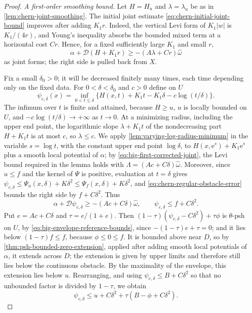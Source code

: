 \begin{proof}
\emph{A first-order smoothing bound.} Let $H=H_u$ and $\lambda=\lambda_u$ be as in \cref{lem:chern-joint-smoothing}. The initial joint estimate \eqref{eq:chern-initial-joint-bound} improves after adding $K_1r$. Indeed, the vertical Levi form of $K_1|w|$ is $K_1/(4r)$, and Young's inequality absorbs the bounded mixed term at a horizontal cost $Cr$. Hence, for a fixed sufficiently large $K_1$ and small $r$,
\begin{equation}\label{eq:big-first-corrected-joint}
 \alpha+\mathcal D(H+K_1r)\geq-(A\lambda+Cr)\widehat\omega
\end{equation}
as joint forms; the right side is pulled back from $X$.

Fix a small $\delta_0>0$; it will be decreased finitely many times, each time depending only on the fixed data. For $0<\delta<\delta_0$ and $c>0$ define on $U$
\[
 \psi_{c,\delta}(x)=\inf_{0<t\leq\delta}
 \{H(x,t)+K_1t-K_1\delta-c\log(t/\delta)\}.
\]
The infimum over $t$ is finite and attained, because $H\geq u$, $u$ is locally bounded on $U$, and $-c\log(t/\delta)\to+\infty$ as $t\to0$. At a minimizing radius, including the upper end point, the logarithmic slope $\lambda+K_1t$ of the nondecreasing part $H+K_1t$ is at most $c$, so $\lambda\leq c$. We apply \cref{lem:varying-log-radius-minimum} in the variable $s=\log t$, with the constant upper end point $\log\delta$, to $H(x,\mathrm e^s)+K_1\mathrm e^s$ plus a smooth local potential of $\alpha$; by \eqref{eq:big-first-corrected-joint}, the Levi bound required in the lemma holds with $\Lambda=(Ac+C\delta)\widehat\omega$. Moreover, since $u\leq f$ and the kernel of $\Psi$ is positive, evaluation at $t=\delta$ gives $\psi_{c,\delta}\leq\Psi_u(x,\delta)+K\delta^2\leq\Psi_f(x,\delta)+K\delta^2$, and \eqref{eq:chern-regular-obstacle-error} bounds the right side by $f+C\delta^2$. Thus
\[
 \alpha+\mathcal D\psi_{c,\delta}\geq-(Ac+C\delta)\widehat\omega,
 \qquad \psi_{c,\delta}\leq f+C\delta^2.
\]
Put $e=Ac+C\delta$ and $\tau=e/(1+e)$. Then $(1-\tau)(\psi_{c,\delta}-C\delta^2)+\tau\phi$ is $\theta$-psh on $U$, by \eqref{eq:big-envelope-reference-bounds}, since $-(1-\tau)e+\tau=0$; and it lies below $(1-\tau)f\leq f$, because $\phi\leq0\leq f$. It is bounded above near $D$, so by \cref{thm:psh-bounded-zero-extension}, applied after adding smooth local potentials of $\alpha$, it extends across $D$; the extension is given by upper limits and therefore still lies below the continuous obstacle. By the maximality of the envelope, this extension lies below $u$. Rearranging, and using $\psi_{c,\delta}\leq B+C\delta^2$ so that no unbounded factor is divided by $1-\tau$, we obtain
\begin{equation}\label{eq:big-first-envelope-comparison}
 \psi_{c,\delta}\leq u+C\delta^2
                         +\tau(B-\phi+C\delta^2).
\end{equation}


\end{proof}
